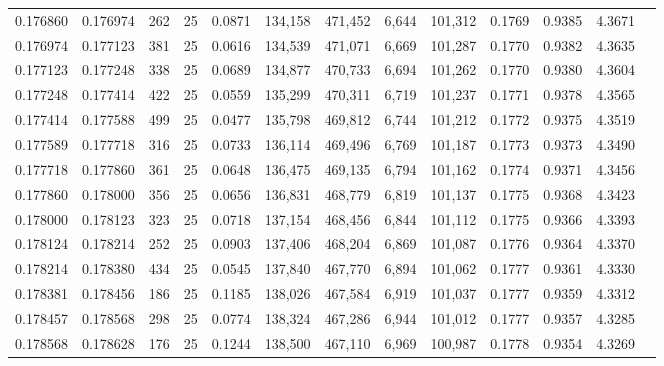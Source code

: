 \begin{tabular}{rrrrrrrrrrrrr}
0.176860 & 0.176974 &   262 &  25 &                                     0.0871 & 134,158 & 471,452 &   6,644 & 101,312 & 0.1769 & 0.9385 & 4.3671 \\
0.176974 & 0.177123 &   381 &  25 &                                     0.0616 & 134,539 & 471,071 &   6,669 & 101,287 & 0.1770 & 0.9382 & 4.3635 \\
0.177123 & 0.177248 &   338 &  25 &                                     0.0689 & 134,877 & 470,733 &   6,694 & 101,262 & 0.1770 & 0.9380 & 4.3604 \\
0.177248 & 0.177414 &   422 &  25 &                                     0.0559 & 135,299 & 470,311 &   6,719 & 101,237 & 0.1771 & 0.9378 & 4.3565 \\
0.177414 & 0.177588 &   499 &  25 &                                     0.0477 & 135,798 & 469,812 &   6,744 & 101,212 & 0.1772 & 0.9375 & 4.3519 \\
0.177589 & 0.177718 &   316 &  25 &                                     0.0733 & 136,114 & 469,496 &   6,769 & 101,187 & 0.1773 & 0.9373 & 4.3490 \\
0.177718 & 0.177860 &   361 &  25 &                                     0.0648 & 136,475 & 469,135 &   6,794 & 101,162 & 0.1774 & 0.9371 & 4.3456 \\
0.177860 & 0.178000 &   356 &  25 &                                     0.0656 & 136,831 & 468,779 &   6,819 & 101,137 & 0.1775 & 0.9368 & 4.3423 \\
0.178000 & 0.178123 &   323 &  25 &                                     0.0718 & 137,154 & 468,456 &   6,844 & 101,112 & 0.1775 & 0.9366 & 4.3393 \\
0.178124 & 0.178214 &   252 &  25 &                                     0.0903 & 137,406 & 468,204 &   6,869 & 101,087 & 0.1776 & 0.9364 & 4.3370 \\
0.178214 & 0.178380 &   434 &  25 &                                     0.0545 & 137,840 & 467,770 &   6,894 & 101,062 & 0.1777 & 0.9361 & 4.3330 \\
0.178381 & 0.178456 &   186 &  25 &                                     0.1185 & 138,026 & 467,584 &   6,919 & 101,037 & 0.1777 & 0.9359 & 4.3312 \\
0.178457 & 0.178568 &   298 &  25 &                                     0.0774 & 138,324 & 467,286 &   6,944 & 101,012 & 0.1777 & 0.9357 & 4.3285 \\
0.178568 & 0.178628 &   176 &  25 &                                     0.1244 & 138,500 & 467,110 &   6,969 & 100,987 & 0.1778 & 0.9354 & 4.3269 \\

\end{tabular}
